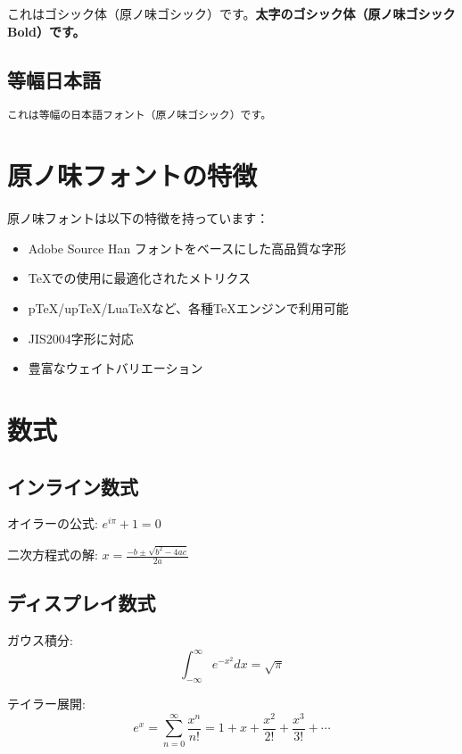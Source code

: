 \documentclass[a4paper,12pt]{ltjsarticle}
\begin{document}
\textsf{これはゴシック体（原ノ味ゴシック）です。\textbf{太字のゴシック体（原ノ味ゴシック Bold）です。}}

\subsection{等幅日本語}

\texttt{これは等幅の日本語フォント（原ノ味ゴシック）です。}

\section{原ノ味フォントの特徴}

原ノ味フォントは以下の特徴を持っています：

\begin{itemize}
    \item Adobe Source Han フォントをベースにした高品質な字形
    \item \TeX{}での使用に最適化されたメトリクス
    \item pTeX/upTeX/LuaTeXなど、各種\TeX{}エンジンで利用可能
    \item JIS2004字形に対応
    \item 豊富なウェイトバリエーション
\end{itemize}

\section{数式}

\subsection{インライン数式}

オイラーの公式: $e^{i\pi} + 1 = 0$

二次方程式の解: $x = \frac{-b \pm \sqrt{b^2 - 4ac}}{2a}$

\subsection{ディスプレイ数式}

ガウス積分:
\begin{equation}
    \int_{-\infty}^{\infty} e^{-x^2} dx = \sqrt{\pi}
\end{equation}

テイラー展開:
\begin{equation}
    e^x = \sum_{n=0}^{\infty} \frac{x^n}{n!} = 1 + x + \frac{x^2}{2!} + \frac{x^3}{3!} + \cdots
\end{equation}
\end{document}
